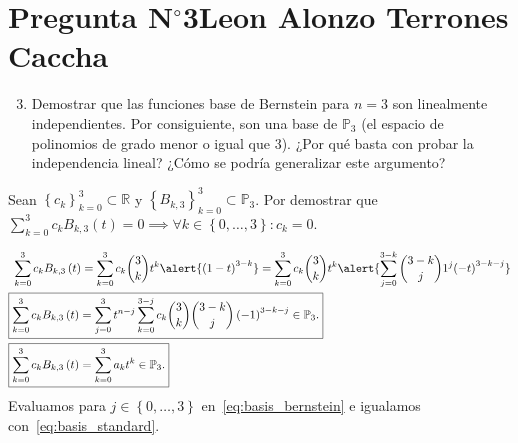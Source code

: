 \section{Pregunta N$^{\circ}$3\qquad Leon Alonzo Terrones Caccha}

\begin{frame}
    \begin{enumerate}\setcounter{enumi}{2}
        \item
              Demostrar que las funciones base de Bernstein para
              $n=3$ son linealmente independientes.
              Por consiguiente, son una base de $\mathbb{P}_{3}$
              (\alert{el espacio de polinomios de grado menor o igual
                  que $3$}).
              ¿Por qué basta con probar la independencia lineal?
              ¿Cómo se podría generalizar este argumento?
    \end{enumerate}

    \begin{solution}
        Sean
        \begin{math}
            {\left\{c_{k}\right\}}^{3}_{k=0}\subset\mathbb{R}
        \end{math}
        y
        \begin{math}
            {\left\{B_{k,3}\right\}}^{3}_{k=0}\subset\mathbb{P}_{3}
        \end{math}.
        Por demostrar que
        \begin{math}
            \sum\limits_{k=0}^{3}
            c_{k}
            B_{k,3}\left(t\right)=
            0\implies
            \forall k\in\left\{0,\dotsc,3\right\}:
            c_{k}=0
        \end{math}.

        \begin{align}
            \sum_{k=0}^{3}
            c_{k}
            B_{k,3}\left(t\right)
             & =
            \sum_{k=0}^{3}
            c_{k}
            \binom{3}{k}
            t^{k}
            \alert{
                {\left(1-t\right)}^{3-k}
            }=
            \sum_{k=0}^{3}
            c_{k}\binom{3}{k}t^k
            \alert{
                \sum_{j=0}^{3-k}
                \binom{3-k}{j}
                1^{j}
                    {\left(-t\right)}^{3-k-j}
            }\notag \\
            \label{eq:basis_bernstein}
            \Aboxed{
                \sum_{k=0}^{3}
                c_{k}
                B_{k,3}\left(t\right)
             & =
                \sum_{j=0}^{3}
                t^{n-j}
                \sum_{k=0}^{3-j}
                c_{k}
                \binom{3}{k}
                \binom{3-k}{j}
                \left(-1\right)^{3-k-j}\in\mathbb{P}_{3}.
            }       \\
            \label{eq:basis_standard}
            \Aboxed{
                \sum_{k=0}^{3}
                c_{k}
                B_{k,3}\left(t\right)
             & =
                \sum_{k=0}^{3}
                a_{k}
                t^{k}\in\mathbb{P}_{3}.
            }
        \end{align}
        Evaluamos para $j\in\left\{0,\dotsc,3\right\}$
        en~\eqref{eq:basis_bernstein} e igualamos
        con~\eqref{eq:basis_standard}.


\end{solution}
\end{frame}
